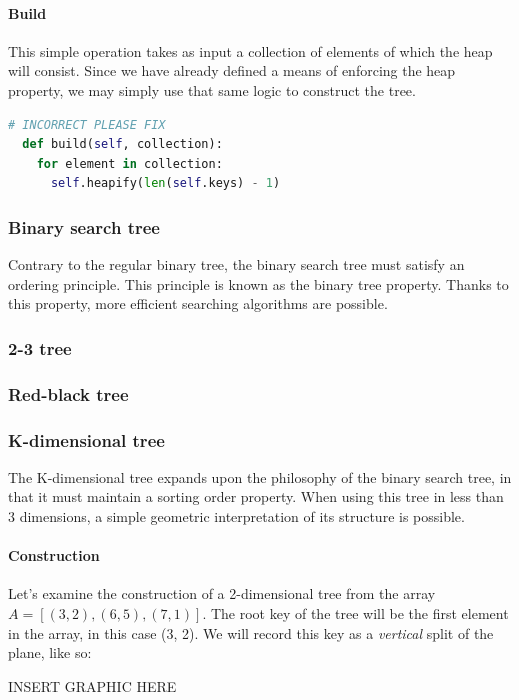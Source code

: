 \documentclass{article}
\begin{document}
\paragraph{Build}
This simple operation takes as input a collection of elements of which the heap will consist.
Since we have already defined a means of enforcing the heap property, we may simply use that same logic to construct the tree.

\begin{lstlisting}[language=Python]
  # INCORRECT PLEASE FIX
  def build(self, collection):
    for element in collection:
      self.heapify(len(self.keys) - 1)
\end{lstlisting}  

\subsubsection{Binary search tree}
Contrary to the regular binary tree, the binary search tree must satisfy an ordering principle.
This principle is known as the binary tree property. Thanks to this property,
more efficient searching algorithms are possible.

\subsubsection{2-3 tree}
\subsubsection{Red-black tree}

\subsubsection{K-dimensional tree}
The K-dimensional tree expands upon the philosophy of the binary search tree, in that it
must maintain a sorting order property. When using this tree in less than 3 dimensions,
a simple geometric interpretation of its structure is possible.

\paragraph{Construction}
Let's examine the construction of a 2-dimensional tree from the array \(A = [(3, 2), (6, 5), (7, 1)]\).
The root key of the tree will be the first element in the array, in this case (3, 2).
We will record this key as a {\em vertical} split of the plane, like so:

{\huge INSERT GRAPHIC HERE}
\end{document}

